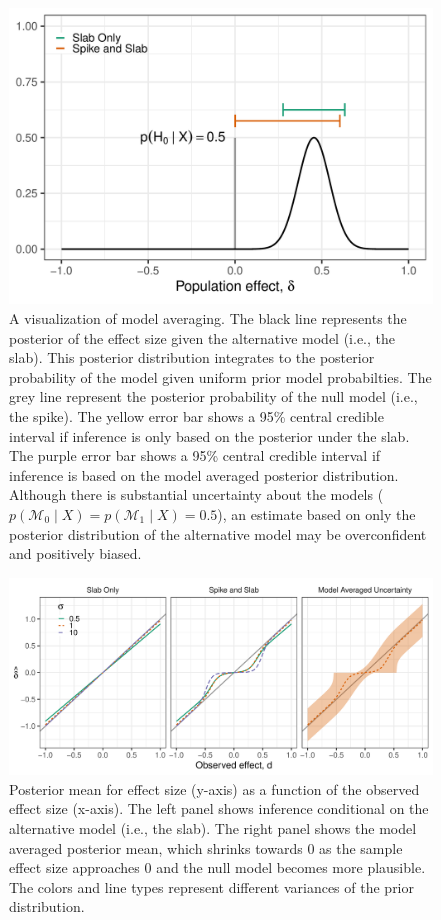 \documentclass[a4paper]{article}
\newcommand{\model}{\mathcal{M}}
\begin{document}
	
	\begin{figure}[!ht]
		\includegraphics[width=\textwidth]{spikeAndSlabPosteriorRescaledPosteriorMode.pdf}
		\caption{A visualization of model averaging. The black line represents the posterior of the effect size given the alternative model (i.e., the slab). This posterior distribution integrates to the posterior probability of the model given uniform prior model probabilties. The grey line represent the posterior probability of the null model (i.e., the spike). The yellow error bar shows a 95\% central credible interval if inference is only based on the posterior under the slab. The purple error bar shows a 95\% central credible interval if inference is based on the model averaged posterior distribution. Although there is substantial uncertainty about the models ($p(\model_0\mid X) = p(\model_1\mid X) = 0.5$), an estimate based on only the posterior distribution of the alternative model may be overconfident and positively biased.}
		\label{fig:modelAveragedPosterior}
	\end{figure}
	
	\begin{figure}[!ht]
		\includegraphics[width=\textwidth]{posteriorMeanVsSampleDelta3panel.pdf}
		\caption{Posterior mean for effect size (y-axis) as a function of the observed effect size (x-axis). The left panel shows inference conditional on the alternative model (i.e., the slab). The right panel shows the model averaged posterior mean, which shrinks towards 0 as the sample effect size approaches 0 and the null model becomes more plausible. The colors and line types represent different variances of the prior distribution.}
		\label{fig:posteriorMeanVsSampleDelta}
	\end{figure}
	
\end{document}
